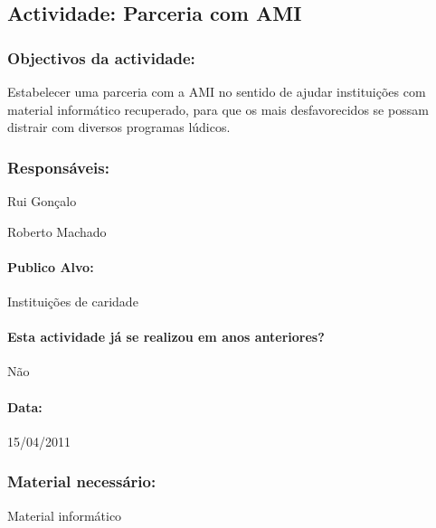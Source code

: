 \subsection{Actividade: Parceria com AMI} %

\subsubsection*{Objectivos da actividade:}
Estabelecer uma parceria com a AMI no sentido de ajudar instituições com material informático recuperado, para que os mais desfavorecidos se possam distrair com diversos programas lúdicos.

\subsubsection*{Responsáveis:}
\begin{itemizedash}
	\item{Rui Gonçalo}
	\item{Roberto Machado}
\end{itemizedash}

\paragraph{Publico Alvo: }
Instituições de caridade

\paragraph{Esta actividade já se realizou em anos anteriores?}
Não


\paragraph{Data:} 15/04/2011

\subsubsection*{Material necessário:}
\begin{itemizedash}
	\item{Material informático}
\end{itemizedash}

